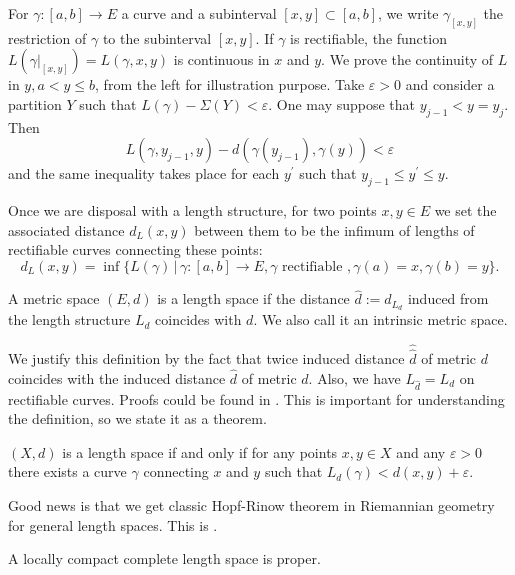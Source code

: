 \begin{rmk}
	For $\gamma : [a, b] \rightarrow E$ a curve and a subinterval $[x , y] \subset [a,b]$,
	we write $\gamma_{[x , y]}$ the restriction of $\gamma$ to the subinterval $[x , y]$.
	If \( \gamma \) is rectifiable,
	the function \( L \left( \gamma | _ { [ x , y ] } \right) = L ( \gamma , x , y ) \) is continuous
	in \( x \) and \( y \).
	We prove the continuity of \( L \) in \( y , a < y \leq b \),
	from the left for illustration purpose.
	Take \( \varepsilon > 0 \) and
	consider a partition \( Y \) such that \( L ( \gamma ) - \Sigma ( Y ) < \varepsilon \). One may suppose that
	\( y _ { j - 1 } < y = y _ { j } \). Then
	\[
		L \left( \gamma , y _ { j - 1 } , y \right) - d \left( \gamma \left( y _ { j - 1 } \right) , \gamma ( y ) \right) < \varepsilon
	\]
	and the same inequality takes place for each $y^\prime$ such that $y_{j-1} \leq y^\prime \leq y$.
\end{rmk}

Once we are disposal with a length structure,
for two points \( x , y \in E \) we set the associated distance \( d_L ( x , y ) \) between them to be the infimum of lengths of rectifiable curves connecting these points:
\[
	d _ { L } ( x , y ) = \inf \{ L ( \gamma ) \,|\, \gamma: [ a , b ] \rightarrow E , \gamma \text{ rectifiable }, \gamma ( a ) = x , \gamma ( b ) = y \}.
\]

\begin{defn}
	\label{defn:length_space}
	A metric space $(E,d)$ is a length space if the distance $\hat{d} := d_{L_{d}}$ induced
	from the length structure $L_d$ coincides with $d$. We also call it an intrinsic metric space.
\end{defn}

We justify this definition by the fact that
twice induced distance $\hat{\hat{d}}$ of metric $d$ coincides with the induced distance $\hat{d}$ of metric $d$.
Also, we have $L_{\hat{d}} = L_{d}$ on rectifiable curves.
Proofs could be found in \cite[Section 2.3]{burago2001course}.
This is important for understanding the definition,
so we state it as a theorem.

\begin{thm}
	\( ( X , d ) \) is a length space if and only if for any points
	\( x , y \in X \) and any \( \varepsilon > 0 \) there exists a curve \( \gamma \) connecting \( x \) and \( y \) such
	that \( L _ { d } ( \gamma ) < d ( x , y ) + \varepsilon \).
\end{thm}

Good news is that we get classic Hopf-Rinow theorem in Riemannian geometry for general length spaces.
This is \cite[Proposition 2.5.22]{burago2001course}.

\begin{prop}
	A locally compact complete length space is proper.
\end{prop}
